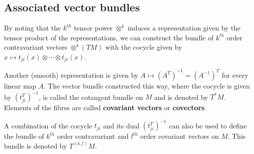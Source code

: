 	
\subsection{Associated vector bundles}
	

	\begin{example}
		By noting that the $k^{th}$ tensor power $\otimes^k$ induces a representation given by the tensor product of the representations, we can construct the bundle of $k^{th}$ order contravariant vectors $\otimes^k(TM)$ with the cocycle given by $x\mapsto t_{ji}(x)\otimes\cdots\otimes t_{ji}(x)$.
	\end{example}
	\begin{example}\label{manifolds:cotangent_bundle}
		Another (smooth) representation is given by $A\mapsto (A^T)^{-1}=(A^{-1})^T$ for every linear map $A$. The vector bundle constructed this way, where the cocycle is given by $(t_{ji}^T)^{-1}$, is called the cotangent bundle on $M$ and is denoted by $T^*M$. Elements of the fibres are called \textbf{covariant vectors} or \textbf{covectors}.
	\end{example}
	\begin{notation}
		A combination of the cocycle $t_{ji}$ and its dual $(t_{ji}^T)^{-1}$ can also be used to define the bundle of $k^{th}$ order contravariant and $l^{th}$ order covariant vectors on $M$. This bundle is denoted by $T^{(k, l)}M$.
	\end{notation}
	
